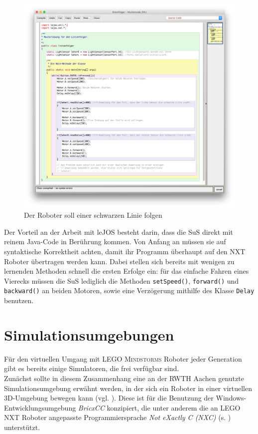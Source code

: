 \documentclass[paper=a4, DIV=calc, BCOR=15mm, twoside=on, onecolumn=on, open = right, titlepage =on, parskip =half, headsepline = on, footsepline = on, chapterprefix = off, appendixprefix = off, fontsize = 12pt, numbers = noenddot, abstract = on]{scrbook}
\begin{document}
\begin{figure}[htbp]
\centering
\includegraphics[width=\textwidth]{images/linienfolger_bluej.png} 
\caption{Der Roboter soll einer schwarzen Linie folgen}
\label{fig:Bsp BlueJ Linienfolger}
\end{figure} 

Der Vorteil an der Arbeit mit leJOS besteht darin, dass die SuS direkt mit reinem Java-Code in Berührung kommen. Von Anfang an müssen sie auf syntaktische Korrektheit achten, damit ihr Programm überhaupt auf den NXT Roboter übertragen werden kann. Dabei stellen sich bereits mit wenigen zu lernenden Methoden schnell die ersten Erfolge ein: für das einfache Fahren eines Vierecks müssen die SuS lediglich die  Methoden \texttt{setSpeed()}, \texttt{forward()} und \texttt{backward()} an beiden Motoren, sowie eine Verzögerung mithilfe des Klasse \texttt{Delay} benutzen. 



\par \singlespacing
\section{Simulationsumgebungen}
\label{sec:simulationsumgebungen}
\onehalfspacing
Für den virtuellen Umgang mit \textsc{LEGO Mindstorms} Roboter jeder Generation gibt es bereits einige Simulatoren, die frei verfügbar sind.\\
Zunächst sollte in diesem Zusammenhang eine an der RWTH Aachen genutzte Simulationsumgebung erwähnt werden, in der sich ein Roboter in einer virtuellen 3D-Umgebung bewegen kann (vgl. \cite{rwth}). Diese ist für die Benutzung der Windows-Entwicklungsumgebung \emph{BricxCC} konzipiert, die unter anderem die an \textsc{LEGO} NXT Roboter angepasste Programmiersprache \emph{Not eXactly C (NXC)} (s. \cite{bricxcc}) unterstützt.
\end{document}
